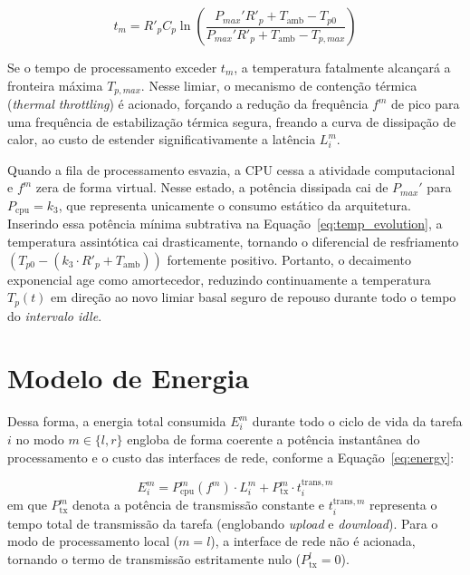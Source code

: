 \begin{equation}
\label{eq:thermal_throttling}
t_m = R'_p C_p \ln\left(\frac{P_{max}' R'_p + T_{\mathrm{amb}} - T_{p0}}{P_{max}' R'_p + T_{\mathrm{amb}} - T_{p,max}}\right)
\end{equation}

Se o tempo de processamento exceder $t_m$, a temperatura fatalmente alcançará a fronteira máxima $T_{p,max}$. Nesse limiar, o mecanismo de contenção térmica (\textit{thermal throttling}) é acionado, forçando a redução da frequência $f^m$ de pico para uma frequência de estabilização térmica segura, freando a curva de dissipação de calor, ao custo de estender significativamente a latência $L_i^m$.

Quando a fila de processamento esvazia, a \gls{CPU} cessa a atividade computacional e $f^m$ zera de forma virtual. Nesse estado, a potência dissipada cai de $P_{max}'$ para $P_{\mathrm{cpu}} = k_3$, que representa unicamente o consumo estático da arquitetura. Inserindo essa potência mínima subtrativa na Equação~\ref{eq:temp_evolution}, a temperatura assintótica cai drasticamente, tornando o diferencial de resfriamento $(T_{p0} - (k_3 \cdot R'_p + T_{\mathrm{amb}}))$ fortemente positivo. Portanto, o decaimento exponencial age como amortecedor, reduzindo continuamente a temperatura $T_p(t)$ em direção ao novo limiar basal seguro de repouso durante todo o tempo do \textit{intervalo idle}.


\section{Modelo de Energia}


Dessa forma, a energia total consumida $E_i^m$ durante todo o ciclo de vida da tarefa $i$ no modo $m \in \{l, r\}$ engloba de forma coerente a potência instantânea do processamento e o custo das interfaces de rede, conforme a Equação~\ref{eq:energy}:

\begin{equation}
\label{eq:energy}
E_i^m = P_{\mathrm{cpu}}^m(f^m) \cdot L_i^m + P_{\mathrm{tx}}^m \cdot t_i^{\mathrm{trans},m}
\end{equation}
em que $P_{\mathrm{tx}}^m$ denota a potência de transmissão constante e $t_i^{\mathrm{trans},m}$ representa o tempo total de transmissão da tarefa (englobando \textit{upload} e \textit{download}). Para o modo de processamento local ($m=l$), a interface de rede não é acionada, tornando o termo de transmissão estritamente nulo ($P_{\mathrm{tx}}^l = 0$).


